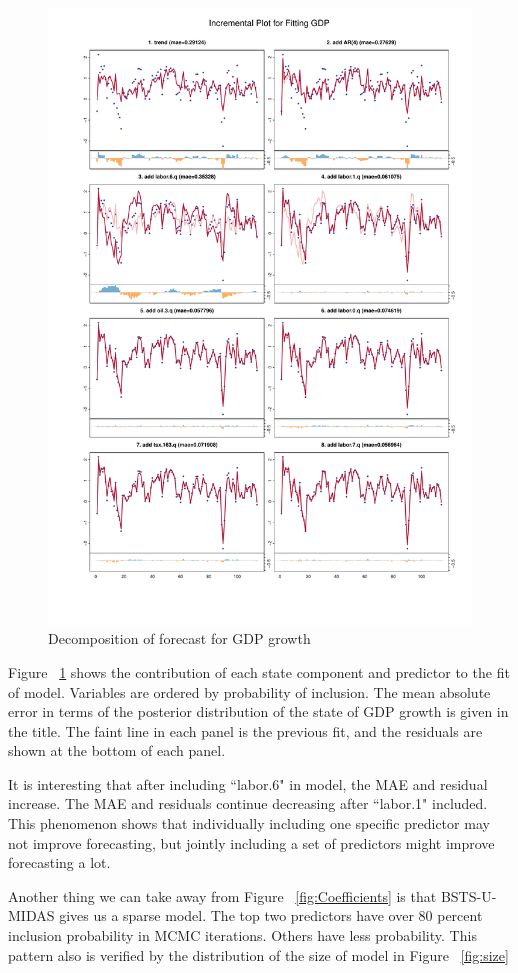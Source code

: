 \begin{figure}[p]
	\centering
	\includegraphics[width=0.8\linewidth]{Figures/GDPincremental}
	\caption{Decomposition of forecast for GDP growth}
	\label{fig:GDPincremental}
\end{figure}

Figure ~\ref{fig:GDPincremental} shows the contribution of each state component and predictor to the fit of model. Variables are ordered by probability of inclusion. The mean absolute error in terms of the posterior distribution of the state of GDP growth is given in the title. The faint line in each panel is the previous fit, and the residuals are shown at the bottom of each panel. 

It is interesting that after including ``labor.6" in model, the MAE and residual increase. The MAE and residuals continue decreasing  after  ``labor.1" included. This phenomenon shows that individually including one specific predictor may not improve forecasting, but jointly including a set of predictors might improve forecasting a lot. 


Another thing we can take away from Figure ~\ref{fig:Coefficients} is that BSTS-U-MIDAS gives us a sparse model. The top two predictors have over 80 percent inclusion probability in MCMC iterations. Others have less probability. This pattern also is  verified by the distribution of the size of model in Figure ~\ref{fig:size} 

